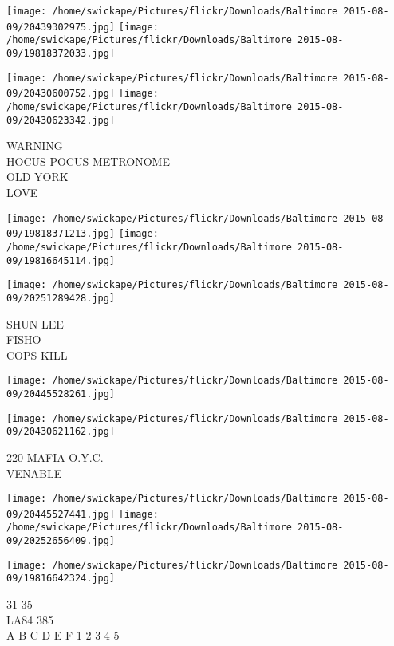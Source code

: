 \documentclass[10pt,letterpaper]{article}
\begin{document}
\texttt{[image: /home/swickape/Pictures/flickr/Downloads/Baltimore 2015-08-09/20439302975.jpg]}
\texttt{[image: /home/swickape/Pictures/flickr/Downloads/Baltimore 2015-08-09/19818372033.jpg]}

\texttt{[image: /home/swickape/Pictures/flickr/Downloads/Baltimore 2015-08-09/20430600752.jpg]}
\texttt{[image: /home/swickape/Pictures/flickr/Downloads/Baltimore 2015-08-09/20430623342.jpg]}

WARNING\\
HOCUS POCUS METRONOME\\
OLD YORK\\
LOVE\\
\pagebreak

\texttt{[image: /home/swickape/Pictures/flickr/Downloads/Baltimore 2015-08-09/19818371213.jpg]}
\texttt{[image: /home/swickape/Pictures/flickr/Downloads/Baltimore 2015-08-09/19816645114.jpg]}

\vspace{0.25in}
\texttt{[image: /home/swickape/Pictures/flickr/Downloads/Baltimore 2015-08-09/20251289428.jpg]}

SHUN LEE\\
FISHO\\
COPS KILL\\
\pagebreak

\texttt{[image: /home/swickape/Pictures/flickr/Downloads/Baltimore 2015-08-09/20445528261.jpg]}

\vspace{0.25in}
\texttt{[image: /home/swickape/Pictures/flickr/Downloads/Baltimore 2015-08-09/20430621162.jpg]}

220 MAFIA O.Y.C.\\
VENABLE\\
\pagebreak

\texttt{[image: /home/swickape/Pictures/flickr/Downloads/Baltimore 2015-08-09/20445527441.jpg]}
\texttt{[image: /home/swickape/Pictures/flickr/Downloads/Baltimore 2015-08-09/20252656409.jpg]}

\texttt{[image: /home/swickape/Pictures/flickr/Downloads/Baltimore 2015-08-09/19816642324.jpg]}

31 35\\
LA84 385\\
A B C D E F 1 2 3 4 5\\
\pagebreak
\end{document}

